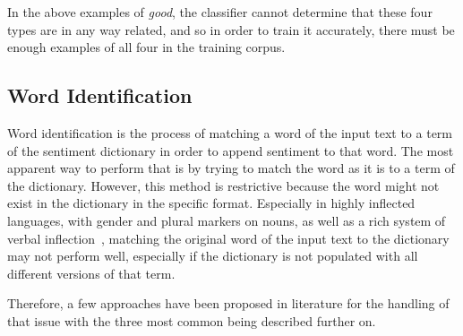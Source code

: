 In the above examples of \emph{good},
the classifier cannot determine that these four types are in any way related, and so in order to train it accurately,
there must be enough examples of all four in the training corpus.

\subsection{Word Identification}
\label{subsec:identification}

Word identification is the process of matching a word of the input text
to a term of the sentiment dictionary in order to append sentiment to that word.
The most apparent way to perform that is by trying to match the word as it is
to a term of the dictionary.
However, this method is restrictive because the word might not exist
in the dictionary in the specific format.
Especially in highly inflected languages,
with gender and plural markers on nouns, as
well as a rich system of verbal inflection~\cite{BTT09},
matching the original word of the input text to the dictionary
may not perform well, especially if the dictionary is not populated
with all different versions of that term.

Therefore, a few approaches have been proposed in literature
for the handling of that issue with the three most common being described further on.

